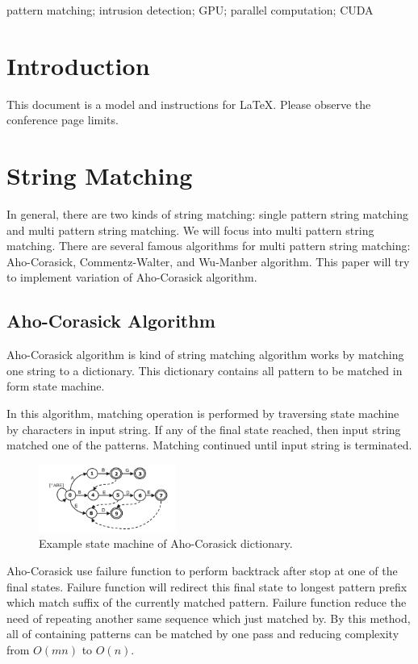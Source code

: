 \documentclass[conference]{IEEEtran}
\begin{document}
\begin{IEEEkeywords}
    pattern matching; intrusion detection; GPU; parallel computation; CUDA
\end{IEEEkeywords}

\section{Introduction}
This document is a model and instructions for \LaTeX.
Please observe the conference page limits. 

\section{String Matching}
In general, there are two kinds of string matching: single pattern string matching and multi pattern string matching. We will focus into multi pattern string matching. There are several famous algorithms for multi pattern string matching: Aho-Corasick, Commentz-Walter, and Wu-Manber algorithm. This paper will try to implement variation of Aho-Corasick algorithm.

    \subsection{Aho-Corasick Algorithm}
    Aho-Corasick algorithm is kind of string matching algorithm works by matching one string to a dictionary. This dictionary contains all pattern to be matched in form state machine. 
    
    In this algorithm, matching operation is performed by traversing state machine by characters in input string. If any of the final state reached, then input string matched one of the patterns. Matching continued until input string is terminated. 

    \begin{figure}[htbp]
        \centerline{\includegraphics[width=0.4\textwidth]{../src/resources/aho-c.png}}
        \caption{Example state machine of Aho-Corasick dictionary.}
        \label{fig}
    \end{figure}

    Aho-Corasick use failure function to perform backtrack after stop at one of the final states. Failure function will redirect this final state to longest pattern prefix which match suffix of the currently matched pattern. Failure function reduce the need of repeating another same sequence which just matched by. By this method, all of containing patterns can be matched by one pass and reducing complexity from $O(mn)$ to $O(n)$. 
\end{document}

